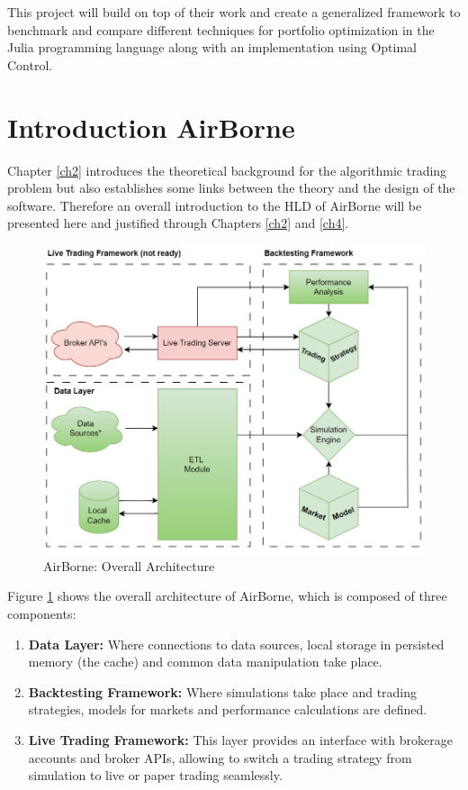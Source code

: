 This project will build on top of their work and create a generalized framework to benchmark and compare different techniques for portfolio optimization in the Julia programming language along with an implementation using Optimal Control.


\section{Introduction AirBorne}
Chapter \ref{ch2} introduces the theoretical background for the algorithmic trading problem but also establishes some links between the theory and the design of the software. Therefore an overall introduction to the \ac{HLD} of AirBorne will be presented here and justified through Chapters \ref{ch2} and \ref{ch4}.

\begin{figure}[h!]
    \centering
    \includegraphics[width=1\textwidth]{imgs/ch1/architecture.png}
    \caption[AirBorne: Overall Architecture]{AirBorne: Overall Architecture}
    \label{fig::AirBorneArchitecture}
\end{figure}

Figure \ref{fig::AirBorneArchitecture} shows the overall architecture of AirBorne, which is composed of three components:
\begin{enumerate}
    \item \textbf{Data Layer:} Where connections to data sources, local storage in persisted memory (the cache) and common data manipulation take place.
    \item \textbf{Backtesting Framework:} Where simulations take place and trading strategies, models for markets and performance calculations are defined.
    \item \textbf{Live Trading Framework:} This layer provides an interface with brokerage accounts and broker \ac{API}s, allowing to switch a trading strategy from simulation to live or paper trading seamlessly. 
\end{enumerate}


